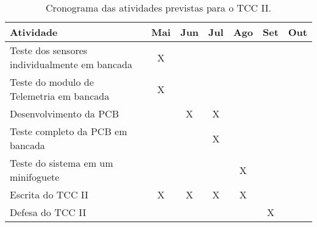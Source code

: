 \begin{table}[!thb]
    \centering
    \caption{Cronograma das atividades previstas para o TCC II.}
    \begin{adjustbox}{max width={\textwidth},keepaspectratio}%
    \begin{tabular}{@{} p{6.5cm}|c|c|c|c|c|c @{}}
        \toprule
        \textbf{Atividade}
        & Mai & Jun & Jul & Ago & Set & Out
        \\ \hline
        Teste dos sensores individualmente em bancada 
        & X   &     &     &     &     &          
        \\ \hline
        Teste do modulo de Telemetria em bancada
        & X   &     &     &     &     &          
        \\ \hline
        Desenvolvimento da PCB
        &    & X   & X    &     &     &          
        \\ \hline
        Teste completo da PCB em bancada
        &     &    & X   &     &     &          
        \\ \hline
        Teste do sistema em um minifoguete 
        &     &    &    & X    &     &    
        \\ \hline
        Escrita do TCC II                       
        & X   & X   & X   & X   &    &         
        \\ \hline
        Defesa do TCC II                        
        &     &     &     &     & X   &        
        \\
        \bottomrule
    \end{tabular}
    \end{adjustbox}
    \label{tab:cronograma} 
\end{table}

